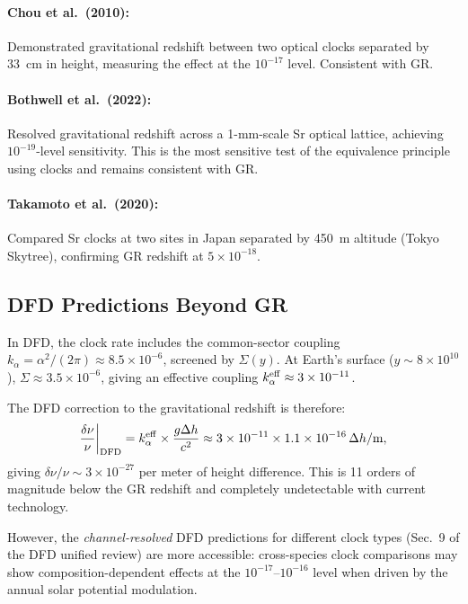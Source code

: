 \documentclass[12pt,letterpaper]{article}
\begin{document}
\paragraph{Chou et al.\ (2010):} Demonstrated gravitational redshift
between two optical clocks separated by 33~cm in height, measuring the
effect at the $10^{-17}$ level. Consistent with GR.

\paragraph{Bothwell et al.\ (2022):} Resolved gravitational redshift
across a 1-mm-scale Sr optical lattice, achieving $10^{-19}$-level
sensitivity. This is the most sensitive test of the equivalence principle
using clocks and remains consistent with GR.

\paragraph{Takamoto et al.\ (2020):} Compared Sr clocks at two sites in
Japan separated by 450~m altitude (Tokyo Skytree), confirming GR redshift
at $5\times10^{-18}$.

\subsection{DFD Predictions Beyond GR}

In DFD, the clock rate includes the common-sector coupling
$k_\alpha = \alpha^2/(2\pi) \approx 8.5\times10^{-6}$, screened by
$\Sigma(y)$. At Earth's surface ($y \sim 8\times10^{10}$),
$\Sigma \approx 3.5\times10^{-6}$, giving an effective coupling
$k_\alpha^{\rm eff} \approx 3\times10^{-11}$.

The DFD correction to the gravitational redshift is therefore:
\begin{equation}
\frac{\delta\nu}{\nu}\bigg|_{\rm DFD} = k_\alpha^{\rm eff}
\times\frac{g\Delta h}{c^2} \approx 3\times10^{-11}
\times 1.1\times10^{-16}\,\Delta h/\text{m},
\end{equation}
giving $\delta\nu/\nu \sim 3\times10^{-27}$ per meter of height difference.
This is 11 orders of magnitude below the GR redshift and completely
undetectable with current technology.

However, the \emph{channel-resolved} DFD predictions for different clock
types (Sec.~9 of the DFD unified review) are more accessible:
cross-species clock comparisons may show composition-dependent effects at
the $10^{-17}$--$10^{-16}$ level when driven by the annual solar potential
modulation.
\end{document}

